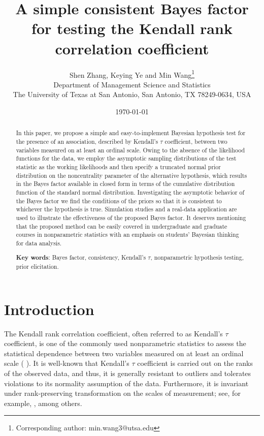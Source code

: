 \documentclass[11pt]{article}
\begin{document}
\title{\bf A simple consistent Bayes factor for testing the Kendall rank correlation coefficient}
\author{Shen Zhang, Keying Ye and Min Wang\thanks{Corresponding author: min.wang3@utsa.edu}\\
   Department of Management Science and Statistics\\
     The University of Texas at San Antonio, San Antonio, TX 78249-0634, USA}
\date{\today}        %
\maketitle

\begin{abstract}
In this paper, we propose a simple and easy-to-implement Bayesian hypothesis test for the presence of an association, described by Kendall's $\tau$ coefficient, between two variables measured on at least an ordinal scale. Owing to the absence of the likelihood functions for the data, we employ the asymptotic sampling distributions of the test statistic as the working likelihoods and then specify a truncated normal prior distribution on the noncentrality parameter of the alternative hypothesis, which results in the Bayes factor available in closed form in terms of the cumulative distribution function of the standard normal distribution. Investigating the asymptotic behavior of the Bayes factor we find the conditions of the priors so that it is consistent to whichever the hypothesis is true. Simulation studies and a real-data application are used to illustrate the effectiveness of the proposed Bayes factor. It deserves mentioning that the proposed method can be easily covered in undergraduate and graduate courses in nonparametric statistics with an emphasis on students' Bayesian thinking for data analysis.

\textbf{Key words}: Bayes factor, consistency, Kendall's $\tau$, nonparametric hypothesis testing, prior elicitation.

\end{abstract}

\newpage

\section{Introduction} \label{Section:01}

The Kendall rank correlation coefficient, often referred to as Kendall's $\tau$ coefficient, is one of the commonly used nonparametric statistics to assess the statistical dependence between two variables measured on at least an ordinal scale (\citeauthor{Kend:1938} \citeyear{Kend:1938}). It is well-known that Kendall's $\tau$ coefficient is carried out on the ranks of the observed data, and thus, it is generally  resistant to outliers and tolerates violations to its normality assumption of the data. Furthermore, it is invariant under rank-preserving transformation on the scales of measurement; see, for example, \cite{Krus:1958, Kenn:Gibb:1990, Wass:2006}, among others.
\end{document}
